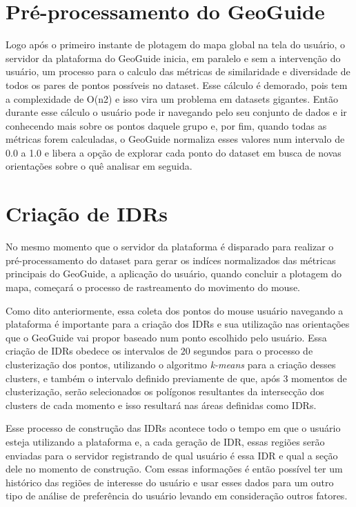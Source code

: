 \section{Pré-processamento do GeoGuide}

Logo após o primeiro instante de plotagem do mapa global na tela do usuário, o servidor da plataforma do GeoGuide inicia, em paralelo e sem a intervenção do usuário, um processo para o calculo das métricas de similaridade e diversidade de todos os pares de pontos possíveis no dataset. Esse cálculo é demorado, pois tem a complexidade de O(n2) e isso vira um problema em datasets gigantes. Então durante esse cálculo o usuário pode ir navegando pelo seu conjunto de dados e ir conhecendo mais sobre os pontos daquele grupo e, por fim, quando todas as métricas forem calculadas, o GeoGuide normaliza esses valores num intervalo de 0.0 a 1.0 e libera a opção de explorar cada ponto do dataset em busca de novas orientações sobre o quê analisar em seguida.

\section{Criação de IDRs}

No mesmo momento que o servidor da plataforma é disparado para realizar o pré-processamento do dataset para gerar os indíces normalizados das métricas principais do GeoGuide, a aplicação do usuário, quando concluir a plotagem do mapa, começará o processo de rastreamento do movimento do mouse.

Como dito anteriormente, essa coleta dos pontos do mouse usuário navegando a plataforma é importante para a criação dos IDRs e sua utilização nas orientações que o GeoGuide vai propor baseado num ponto escolhido pelo usuário. Essa criação de IDRs obedece os intervalos de $20$ segundos para o processo de clusterização dos pontos, utilizando o algoritmo \textit{k-means} para a criação desses clusters, e também o intervalo definido previamente de que, após $3$ momentos de clusterização, serão selecionados os polígonos resultantes da intersecção dos clusters de cada momento e isso resultará nas áreas definidas como IDRs.

Esse processo de construção das IDRs acontece todo o tempo em que o usuário esteja utilizando a plataforma e, a cada geração de IDR, essas regiões serão enviadas para o servidor registrando de qual usuário é essa IDR e qual a seção dele no momento de construção. Com essas informações é então possível ter um histórico das regiões de interesse do usuário e usar esses dados para um outro tipo de análise de preferência do usuário levando em consideração outros fatores.

